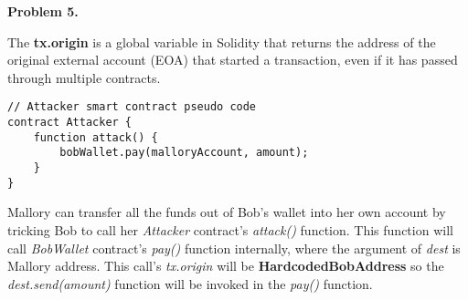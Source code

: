 \documentclass{article}
\begin{document}
\vspace{12pt}

\textbf{Problem 5.}

\vspace{12pt}

The \textbf{tx.origin} is a global variable in Solidity that returns the address of the original external account (EOA) that started a transaction, even if it has passed through multiple contracts. 

\begin{verbatim}
// Attacker smart contract pseudo code
contract Attacker {
    function attack() {
        bobWallet.pay(malloryAccount, amount);
    } 
}
\end{verbatim}

Mallory can transfer all the funds out of Bob’s wallet into her own account by tricking Bob to call her \textit{Attacker} contract's \textit{attack()} function. This function will call \textit{BobWallet} contract's \textit{pay()} function internally, where the argument of \textit{dest} is Mallory address. This call's \textit{tx.origin} will be \textbf{HardcodedBobAddress} so the \textit{dest.send(amount)} function will be invoked in the \textit{pay()} function. 

\vspace{12pt}
\end{document}
